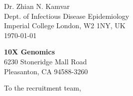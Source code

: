 


\clearpage
\begin{flushright}
  Dr. Zhian N. Kamvar\\
  Dept. of Infectious Disease Epidemiology\\
  Imperial College London, W2 1NY, UK\\
  \today
\end{flushright}

\textbf{10X Genomics}\\
6230 Stoneridge Mall Road\\
Pleasanton, CA 94588-3260





\vspace{1ex}
To the recruitment team,

\vspace{1ex}


